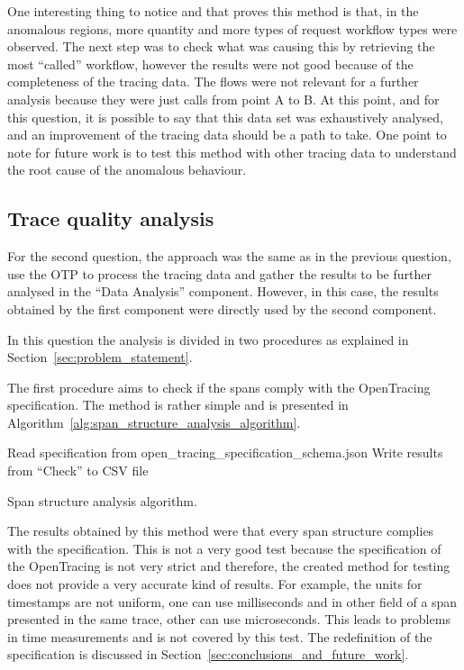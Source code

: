 One interesting thing to notice and that proves this method is that, in the anomalous regions, more quantity and more types of request workflow types were observed. The next step was to check what was causing this by retrieving the most ``called'' workflow, however the results were not good because of the completeness of the tracing data. The flows were not relevant for a further analysis because they were just calls from point A to B. At this point, and for this question, it is possible to say that this data set was exhaustively analysed, and an improvement of the tracing data should be a path to take. One point to note for future work is to test this method with other tracing data to understand the root cause of the anomalous behaviour.

\subsection{Trace quality analysis}
\label{subsec:second_question}

For the second question, the approach was the same as in the previous question, use the OTP to process the tracing data and gather the results to be further analysed in the ``Data Analysis'' component. However, in this case, the results obtained by the first component were directly used by the second component.

In this question the analysis is divided in two procedures as explained in Section~\ref{sec:problem_statement}.

The first procedure aims to check if the spans comply with the OpenTracing specification. The method is rather simple and is presented in Algorithm~\ref{alg:span_structure_analysis_algorithm}.

\begin{algorithm}
  Read specification from open\_tracing\_specification\_schema.json\;
  Write results from ``Check'' to CSV file\;
  \caption{Span structure analysis algorithm.}
  \label{alg:span_structure_analysis_algorithm}
\end{algorithm}

The results obtained by this method were that every span structure complies with the specification. This is not a very good test because the specification of the OpenTracing is not very strict and therefore, the created method for testing does not provide a very accurate kind of results. For example, the units for timestamps are not uniform, one can use milliseconds and in other field of a span presented in the same trace, other can use microseconds. This leads to problems in time measurements and is not covered by this test. The redefinition of the specification is discussed in Section~\ref{sec:conclusions_and_future_work}.

